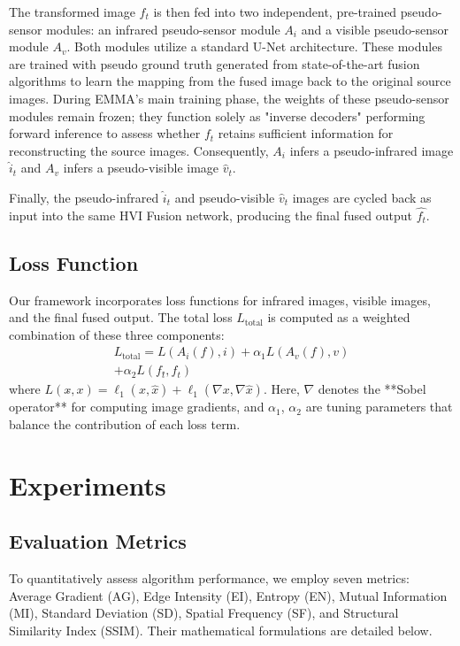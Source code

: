 \documentclass[journal]{IEEEtran}
\begin{document}
The transformed image $f_t$ is then fed into two independent, pre-trained pseudo-sensor modules: an infrared pseudo-sensor module $A_i$ and a visible pseudo-sensor module $A_v$. Both modules utilize a standard U-Net architecture. These modules are trained with pseudo ground truth generated from state-of-the-art fusion algorithms to learn the mapping from the fused image back to the original source images. During EMMA's main training phase, the weights of these pseudo-sensor modules remain frozen; they function solely as "inverse decoders" performing forward inference to assess whether $f_t$ retains sufficient information for reconstructing the source images. Consequently, $A_i$ infers a pseudo-infrared image $\hat{i}_t$ and $A_v$ infers a pseudo-visible image $\hat{v}_t$.

Finally, the pseudo-infrared $\hat{i}_t$ and pseudo-visible $\hat{v}_t$ images are cycled back as input into the same HVI Fusion network, producing the final fused output $\hat{f_t}$.

\subsection{Loss Function}
Our framework incorporates loss functions for infrared images, visible images, and the final fused output. The total loss \(L_{\text{total}}\) is computed as a weighted combination of these three components:
\begin{equation}\label{equ}
    \begin{aligned}
    L_{\text{total}} =  L(A_i(f), i) + \alpha_1 L(A_v(f), v) \\
    + \alpha_2 L(f_t \hat{}, f_t) 
    \end{aligned}
\end{equation}
where \(L(x \hat{}, x) = \ell_1(x, \hat{x}) + \ell_1(\nabla x, \nabla \hat{x})\). Here, \(\nabla\) denotes the **Sobel operator** for computing image gradients, and \(\alpha_1\), \(\alpha_2\) are tuning parameters that balance the contribution of each loss term.

\section{Experiments}
\label{sec:experiments}

\subsection{Evaluation Metrics}
To quantitatively assess algorithm performance, we employ seven metrics: Average Gradient (AG), Edge Intensity (EI), Entropy (EN), Mutual Information (MI), Standard Deviation (SD), Spatial Frequency (SF), and Structural Similarity Index (SSIM). Their mathematical formulations are detailed below.
\end{document}
